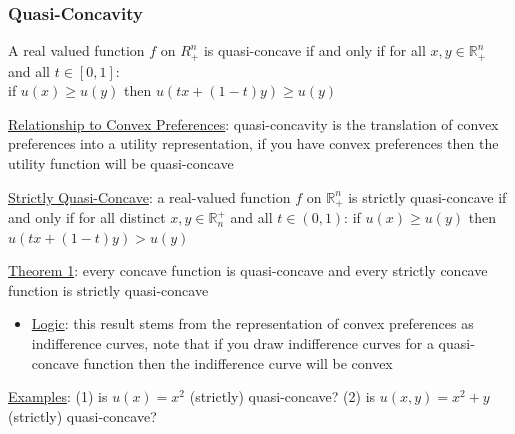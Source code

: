 \documentclass{article}
\begin{document}
\subsubsection{Quasi-Concavity}
A real valued function $f$ on $R_{+}^{n}$ is quasi-concave if and only if for all $x, y \in \mathbb{R}_{+}^{n}$ and all $t \in [0,1]$: \\ if $u(x) \geq u(y)$ then $u(tx + (1-t)y) \geq u(y)$ \par \vspace{0.3em}
  \underline{Relationship to Convex Preferences}: quasi-concavity is the translation of convex preferences into a utility representation, if you have convex preferences then the utility function will be quasi-concave \par
  \underline{Strictly Quasi-Concave}: a real-valued function $f$ on $\mathbb{R}_{+}^{n}$ is strictly quasi-concave if and only if for all distinct $x, y \in \mathbb{R}^{+}_{n}$ and all $t \in (0,1)$: if $u(x) \geq u(y)$ then $u(tx + (1-t)y) > u(y)$
  \par
  \underline{Theorem 1}: every concave function is quasi-concave and every strictly concave function is strictly quasi-concave
  \begin{itemize}
    \item  \underline{Logic}: this result stems from the representation of convex preferences as indifference curves, note that if you draw indifference curves for a quasi-concave function then the indifference curve will be convex
  \end{itemize}
  \par
  \underline{Examples}: (1) is $u(x) = x^{2}$ (strictly) quasi-concave? (2) is $u(x,y) = x^{2} + y$ (strictly) quasi-concave?
\end{document}
